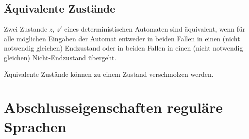 \documentclass{lehramt-informatik-haupt}
\begin{document}
\subsection{Äquivalente Zustände}

Zwei Zustande $z$, $z'$ eines deterministischen Automaten sind
äquivalent, wenn für alle möglichen Eingaben der Automat entweder in
beiden Fallen in einen (nicht notwendig gleichen) Endzustand oder in
beiden Fallen in einen (nicht notwendig gleichen) Nicht-Endzustand
übergeht.

Äquivalente Zustände können zu einem Zustand verschmolzen
werden.

%

\section{Abschlusseigenschaften reguläre Sprachen}
\end{document}

